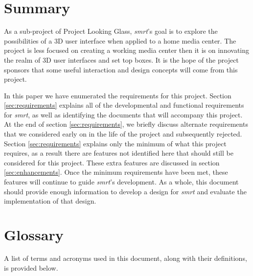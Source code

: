 \documentclass[letterpaper, titlepage, 11pt]{article}
\begin{document}
\section{Summary}
As a sub-project of Project Looking Glass, \textit{smrt}'s goal is to explore
the possibilities of a 3D user interface when applied to a home media center.
The project is less focused on creating a working media center then it is on
innovating the realm of 3D user interfaces and set top boxes. It is the hope of
the project sponsors that some useful interaction and design concepts will come
from this project.

In this paper we have enumerated the requirements for this project. Section
\ref{sec:requirements} explains all of the developmental and functional
requirements for \textit{smrt}, as well as identifying the documents that will
accompany this project. At the end of section \ref{sec:requirements}, we briefly
discuss alternate requirements that we considered early on in the life of the
project and subsequently rejected. Section \ref{sec:requirements} explains only
the minimum of what this project requires, as a result there are features not
identified here that should still be considered for this project. These extra
features are discussed in section \ref{sec:enhancements}. Once the minimum
requirements have been met, these features will continue to guide
\textit{smrt}'s development. As a whole, this document should provide enough
information to develop a design for \textit{smrt} and evaluate the
implementation of that design.

\pagebreak
\appendix
\section{Glossary}
A list of terms and acronyms used in this document, along with their
definitions, is provided below.
\end{document}
